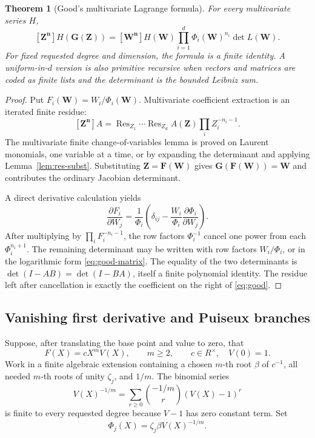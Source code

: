 \documentclass[11pt]{article}
\newtheorem{theorem}{Theorem}[section]
\theoremstyle{definition}
\newcommand{\Res}{\operatorname{Res}}
\begin{document}
\begin{theorem}[Good's multivariate Lagrange formula]\label{thm:good}
For every multivariate series \(H\),
\begin{equation}\label{eq:good}
 [\mathbf Z^{\mathbf n}]H(\mathbf G(\mathbf Z))
 = [\mathbf W^{\mathbf n}]
 H(\mathbf W)\prod_{i=1}^d\Phi_i(\mathbf W)^{n_i}
 \det L(\mathbf W).
\end{equation}
For fixed requested degree and dimension, the formula is a finite identity.  A
uniform-in-\(d\) version is also primitive recursive when vectors and matrices
are coded as finite lists and the determinant is the bounded Leibniz sum.
\end{theorem}
\begin{proof}
Put \(F_i(\mathbf W)=W_i/\Phi_i(\mathbf W)\).  Multivariate coefficient
extraction is an iterated finite residue:
\[
 [\mathbf Z^{\mathbf n}]A
 =\Res_{Z_1}\cdots\Res_{Z_d}
 A(\mathbf Z)\prod_iZ_i^{-n_i-1}.
\]
The multivariate finite change-of-variables lemma is proved on Laurent
monomials, one variable at a time, or by expanding the determinant and applying
Lemma~\ref{lem:res-subst}.  Substituting \(\mathbf Z=\mathbf F(\mathbf W)\)
gives \(\mathbf G(\mathbf F(\mathbf W))=\mathbf W\) and contributes the
ordinary Jacobian determinant.

A direct derivative calculation yields
\[
 \frac{\partial F_i}{\partial W_j}
 =\frac1{\Phi_i}
   \left(\delta_{ij}-\frac{W_i}{\Phi_i}
                     \frac{\partial\Phi_i}{\partial W_j}\right).
\]
After multiplying by \(\prod_iF_i^{-n_i-1}\), the row factors
\(\Phi_i^{-1}\) cancel one power from each \(\Phi_i^{n_i+1}\).  The remaining
determinant may be written with row factors \(W_i/\Phi_i\), or in the
logarithmic form \eqref{eq:good-matrix}.  The equality of the two determinants
is \(\det(I-AB)=\det(I-BA)\), itself a finite polynomial identity.  The residue
left after cancellation is exactly the coefficient on the right of
\eqref{eq:good}.
\end{proof}

\subsection{Vanishing first derivative and Puiseux branches}

Suppose, after translating the base point and value to zero, that
\begin{equation}\label{eq:ramified-F}
 F(X)=cX^mV(X),\qquad m\ge2,
 \qquad c\in R^\times,\quad V(0)=1.
\end{equation}
Work in a finite algebraic extension containing a chosen \(m\)-th root
\(\beta\) of \(c^{-1}\), all needed \(m\)-th roots of unity \(\zeta_j\), and
\(1/m\).  The binomial series
\[
 V(X)^{-1/m}=\sum_{r\ge0}\binom{-1/m}{r}(V(X)-1)^r
\]
is finite to every requested degree because \(V-1\) has zero constant term.
Set
\[
 \Phi_j(X)=\zeta_j\beta V(X)^{-1/m}.
\]
\end{document}
